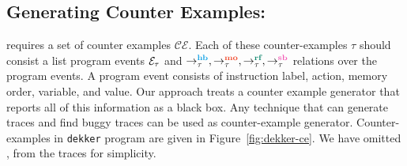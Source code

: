 \subsection{Generating Counter Examples:} 
\ourtechnique requires a set of counter examples $ \mathcal{CE} $. 
Each of these counter-examples $ \tau $ should consist a list program events 
$ \mathcal{E}_\tau $ and $ \setHB, \setMO, \setRF, \setSB $ relations over the 
program events. 
A program event consists of instruction label, action, memory order, variable, and value. 
Our approach treats a counter example generator that reports all of this information as a black box. 
Any technique that can generate \cc traces and find buggy traces can be used as counter-example generator.
Counter-examples in \texttt{dekker} program are given in 
Figure~\ref{fig:dekker-ce}. We have omitted \lsb, \lhb from the traces for 
simplicity. 

%
%

